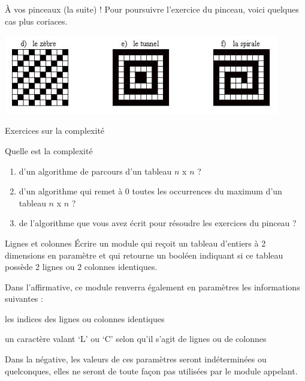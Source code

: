 \begin{Exercice}{À vos pinceaux (la suite) !}
	Pour poursuivre l'exercice du pinceau, 
	voici quelques cas plus coriaces.
	
	\begin{center}
	\includegraphics[width=0.9\textwidth]{image/tab2d-ex-zts}
	\end{center}
\end{Exercice}

\begin{Exercice}{Exercices sur la complexité}

	Quelle est la complexité 
	\begin{enumerate}[label=\alph*)]
	\item 
		d’un algorithme de parcours	d'un tableau $n$ x $n$ ?
	\item
		d'un algorithme qui remet à 0 toutes les
		occurrences du maximum d'un tableau $n$ x $n$ ?
	\item 
		de l'algorithme que vous avez écrit pour résoudre les
		exercices du pinceau ?
	\end{enumerate}
\end{Exercice}

\begin{Exercice}{Lignes et colonnes}
	Écrire un module qui reçoit un tableau d’entiers à 2 dimensions en paramètre 
	et qui retourne un booléen indiquant si ce tableau 
	possède 2 lignes ou 2 colonnes identiques.
	
	Dans l’affirmative, 
	ce module renverra également en paramètres les informations suivantes :
	
	\begin{liste}
	\item les indices des lignes ou colonnes identiques
	\item un caractère valant ‘L’ ou ‘C’ selon qu’il s’agit de lignes ou de
	colonnes
	\end{liste}
	
	Dans la négative, les valeurs de ces paramètres seront indéterminées ou
	quelconques, elles ne seront de toute façon pas utilisées par le module
	appelant.
\end{Exercice}
